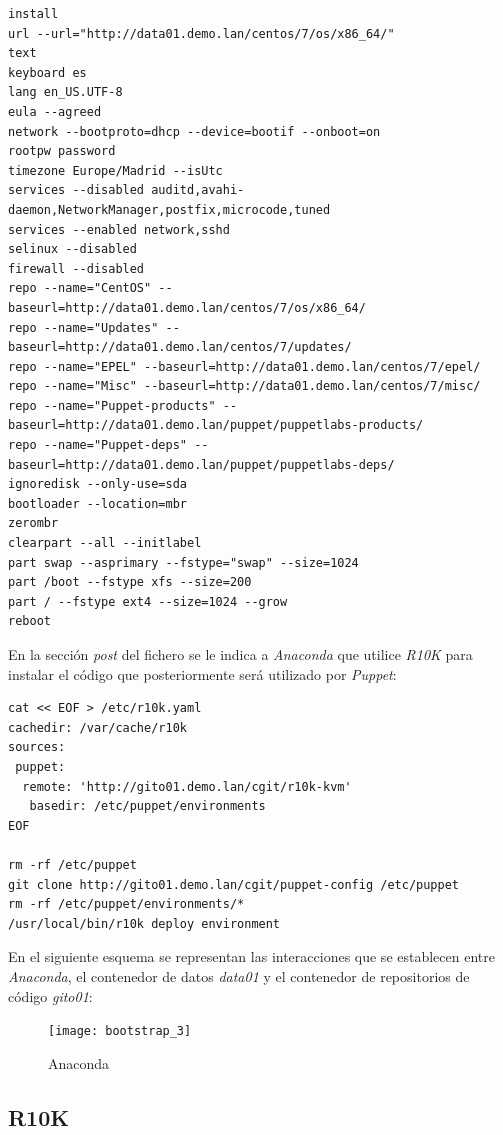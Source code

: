 \documentclass[a4paper,12pt,spanish,final]{epsc_tfc_pfc}
\begin{document}
\begin{lstlisting}[style=dnsmasq]
install
url --url="http://data01.demo.lan/centos/7/os/x86_64/"
text
keyboard es
lang en_US.UTF-8
eula --agreed
network --bootproto=dhcp --device=bootif --onboot=on
rootpw password
timezone Europe/Madrid --isUtc
services --disabled auditd,avahi-daemon,NetworkManager,postfix,microcode,tuned
services --enabled network,sshd
selinux --disabled
firewall --disabled
repo --name="CentOS" --baseurl=http://data01.demo.lan/centos/7/os/x86_64/
repo --name="Updates" --baseurl=http://data01.demo.lan/centos/7/updates/
repo --name="EPEL" --baseurl=http://data01.demo.lan/centos/7/epel/
repo --name="Misc" --baseurl=http://data01.demo.lan/centos/7/misc/
repo --name="Puppet-products" --baseurl=http://data01.demo.lan/puppet/puppetlabs-products/
repo --name="Puppet-deps" --baseurl=http://data01.demo.lan/puppet/puppetlabs-deps/
ignoredisk --only-use=sda
bootloader --location=mbr
zerombr
clearpart --all --initlabel
part swap --asprimary --fstype="swap" --size=1024
part /boot --fstype xfs --size=200
part / --fstype ext4 --size=1024 --grow
reboot
\end{lstlisting}

En la sección \emph{post} del fichero se le indica a \emph{Anaconda} que utilice \emph{R10K} para instalar el código que posteriormente será utilizado por \emph{Puppet}:\\

\begin{lstlisting}[style=dnsmasq]
% post --log=/root/ks-post-chroot.log
cat << EOF > /etc/r10k.yaml
cachedir: /var/cache/r10k
sources:
 puppet:
  remote: 'http://gito01.demo.lan/cgit/r10k-kvm'
   basedir: /etc/puppet/environments
EOF

rm -rf /etc/puppet
git clone http://gito01.demo.lan/cgit/puppet-config /etc/puppet
rm -rf /etc/puppet/environments/*
/usr/local/bin/r10k deploy environment
\end{lstlisting}

En el siguiente esquema se representan las interacciones que se establecen entre \emph{Anaconda}, el contenedor de datos \emph{data01} y el contenedor de repositorios de código \emph{gito01}:

\begin{figure}[h]
  \centering
    \texttt{[image: bootstrap\_3]}
      \caption{Anaconda}
\end{figure}

\subsection{R10K}
\end{document}
